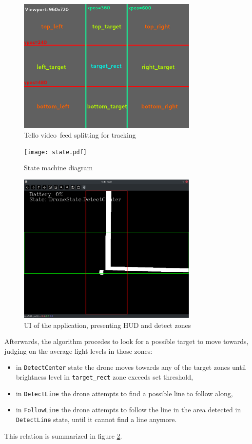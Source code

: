 \documentclass[english,10pt,a4paper,titlepage]{article}
\begin{document}
	\begin{figure}[h]
		\includegraphics[width=0.8\textwidth]{split.png}
		\centering
		\caption{Tello video feed splitting for tracking}
		\label{panes}
	\end{figure}

	\begin{figure}[p]
		\texttt{[image: state.pdf]}
		\centering
		\caption{State machine diagram}
		\label{graph}
	\end{figure}
	
	\begin{figure}[p]
		\includegraphics[width=0.8\textwidth]{demo.png}
		\centering
		\caption{UI of the application, presenting HUD and detect zones}
		\label{demo}
	\end{figure} 
	
	Afterwards, the algorithm procedes to look for a possible target to move towards, judging on the average light levels in those zones:
	\begin{itemize}
		\item in \verb|DetectCenter| state the drone moves towards any of the target zones until brightness level in \verb|target_rect| zone exceeds set threshold,
		\item in \verb|DetectLine| the drone attempts to find a possible line to follow along,
		\item in \verb|FollowLine| the drone attempts to follow the line in the area detected in \verb|DetectLine| state, until it cannot find a line anymore.
	\end{itemize}
	This relation is summarized in figure \ref{graph}. \\
	
\end{document}
